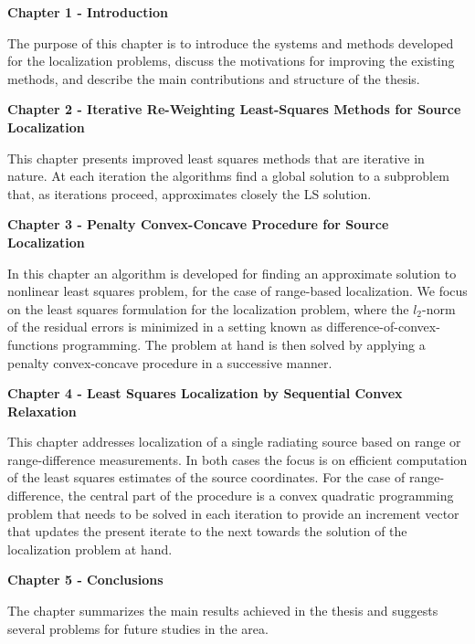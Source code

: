 \phantom{m}

\noindent
\textbf{Chapter 1 - Introduction}

\phantom{m}

\noindent
The purpose of this chapter is to introduce the systems and methods developed for the localization problems, discuss the motivations for improving the existing methods, and describe the main contributions and structure of the thesis.


\phantom{m}

\noindent
\textbf{Chapter 2 - Iterative Re-Weighting Least-Squares Methods for Source Localization}


\phantom{m}

\noindent
This chapter presents improved least squares methods that are iterative in nature. At each iteration the algorithms find a global solution to a subproblem that, as iterations proceed, approximates closely the LS solution.


\phantom{m}

\noindent
\textbf{Chapter 3 - Penalty Convex-Concave Procedure for Source Localization}


\phantom{m}

\noindent
In this chapter an algorithm is developed for finding an approximate solution to nonlinear least squares problem, for the case of range-based localization. We focus on the least squares formulation for the localization problem, where the $l_2$-norm of the residual errors is minimized in a setting known as difference-of-convex-functions programming. The problem at hand is then solved by applying a penalty convex-concave procedure in a successive manner.


\phantom{m}

\noindent
\textbf{Chapter 4 - Least Squares Localization by Sequential Convex Relaxation}


\phantom{m}

\noindent
This chapter addresses localization of a single radiating source based on range or range-difference measurements. In both cases the focus is on efficient computation of the least squares estimates of the source coordinates. For the case of range-difference, the central part of the procedure is a convex quadratic programming problem that needs to be solved in each iteration to provide an increment vector that updates the present iterate to the next towards the solution of the localization problem at hand.

\phantom{m}

\noindent
\textbf{Chapter 5 - Conclusions}

\phantom{m}

\noindent
The chapter summarizes the main results achieved in the thesis and suggests several problems for future studies in the area.
